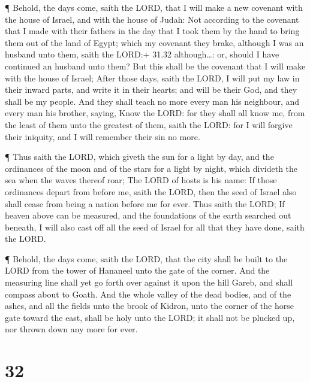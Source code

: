  ¶ Behold, the days come, saith the LORD, that I will make
a new covenant with the house of Israel, and with the house of Judah:
 Not according to the covenant that I made with their
fathers in the day that I took them by the hand to bring them out of the
land of Egypt; which my covenant they brake, although I was an husband
unto them, saith the LORD:+ 31.32 although\ldots: or, should I have
continued an husband unto them?  But this shall be the
covenant that I will make with the house of Israel; After those days,
saith the LORD, I will put my law in their inward parts, and write it in
their hearts; and will be their God, and they shall be my people.
 And they shall teach no more every man his neighbour, and
every man his brother, saying, Know the LORD: for they shall all know
me, from the least of them unto the greatest of them, saith the LORD:
for I will forgive their iniquity, and I will remember their sin no
more.

 ¶ Thus saith the LORD, which giveth the sun for a light by
day, and the ordinances of the moon and of the stars for a light by
night, which divideth the sea when the waves thereof roar; The LORD of
hosts is his name:  If those ordinances depart from before
me, saith the LORD, then the seed of Israel also shall cease from being
a nation before me for ever.  Thus saith the LORD; If
heaven above can be measured, and the foundations of the earth searched
out beneath, I will also cast off all the seed of Israel for all that
they have done, saith the LORD.

 ¶ Behold, the days come, saith the LORD, that the city
shall be built to the LORD from the tower of Hananeel unto the gate of
the corner.  And the measuring line shall yet go forth over
against it upon the hill Gareb, and shall compass about to Goath.
 And the whole valley of the dead bodies, and of the ashes,
and all the fields unto the brook of Kidron, unto the corner of the
horse gate toward the east, shall be holy unto the LORD; it shall not be
plucked up, nor thrown down any more for ever.

\hypertarget{section-31}{%
\section{32}\label{section-31}}

